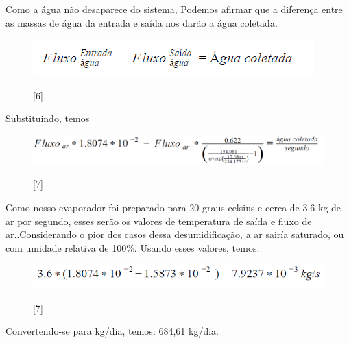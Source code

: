 Como a água não desaparece do sistema, Podemos afirmar que a diferença entre as massas de água da entrada e saída nos darão a água coletada.
\begin{figure}[!h]
    \centering
    \includegraphics[scale = 1]{editaveis/figuras/diferenca}
    \label{diferenca_massa}
    \caption[Diferença entre as massas de água]{[6]}
   \end{figure}
   \FloatBarrier
Substituindo, temos
\begin{figure}[!h]
    \centering
    \includegraphics[scale = 0.6]{editaveis/figuras/fluxo_ar}
    \label{fluxo_ar}
    \caption[Diferença entre as massas de água]{[7]}
   \end{figure}
   \FloatBarrier
Como nosso evaporador foi preparado para 20 graus celsius e cerca de 3.6 kg de ar por segundo,
esses serão os valores de temperatura de saída e fluxo de ar..Considerando o pior dos casos dessa
desumidificação, a ar sairía saturado, ou com umidade relativa de 100\%. Usando esses valores,
temos:
\begin{figure}[!h]
    \centering
    \includegraphics[scale = 1]{editaveis/figuras/calculo}
    \label{calculo_final}
    \caption[Calculo Final]{[7]}
   \end{figure}
   \FloatBarrier
Convertendo-se para kg/dia, temos: 684,61 kg/dia.